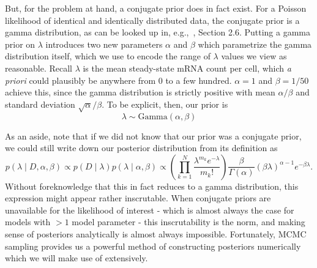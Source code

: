 But, for the problem at hand, a conjugate prior does in fact exist. For a
Poisson likelihood of identical and identically distributed data, the conjugate
prior is a gamma distribution, as can be looked up in, e.g.,~\cite{Gelman2013},
Section 2.6. Putting a gamma prior on $\lambda$ introduces two new parameters
$\alpha$ and $\beta$ which parametrize the gamma distribution itself, which we
use to encode the range of $\lambda$ values we view as reasonable. Recall
$\lambda$ is the mean steady-state mRNA count per cell, which \textit{a priori}
could plausibly be anywhere from 0 to a few hundred. $\alpha=1$ and $\beta=1/50$
achieve this, since the gamma distribution is strictly positive with mean
$\alpha/\beta$ and standard deviation $\sqrt{\alpha}/\beta$. To be explicit,
then, our prior is
\begin{equation}
\lambda \sim \text{Gamma}(\alpha, \beta)
\end{equation}

As an aside, note that if we did not know that our prior was a conjugate prior,
we could still write down our posterior distribution from its definition as
\begin{equation}
p(\lambda\mid D,\alpha,\beta)
\propto p(D\mid\lambda) p(\lambda \mid\alpha,\beta)
\propto \left(\prod_{k=1}^N \frac{\lambda^{m_k}e^{-\lambda}}{m_k!}\right)
        \frac{\beta}{\Gamma(\alpha)}(\beta\lambda)^{\alpha-1} e^{-\beta\lambda}
.
\end{equation}
Without foreknowledge that this in fact reduces to a gamma distribution, this
expression might appear rather inscrutable. When conjugate priors are
unavailable for the likelihood of interest - which is almost always the case for
models with $>1$ model parameter - this inscrutability is the norm, and making
sense of posteriors analytically is almost always impossible. Fortunately, MCMC
sampling provides us a powerful method of constructing posteriors numerically
which we will make use of extensively.

